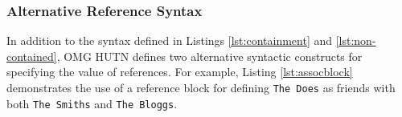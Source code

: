 % 
% 
% 


\subsubsection{Alternative Reference Syntax}
In addition to the syntax defined in Listings \ref{lst:containment} and \ref{lst:non-contained}, OMG HUTN defines two alternative syntactic constructs for specifying the value of references. For example, Listing \ref{lst:assocblock} demonstrates the use of a reference block for defining \texttt{The Does} as friends with both \texttt{The Smiths} and \texttt{The Bloggs}.

